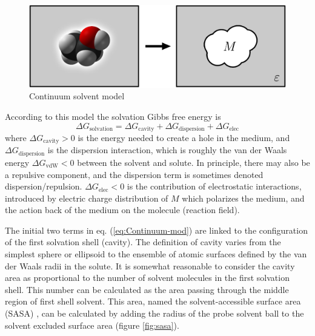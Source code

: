 \begin{figure}[h]
\begin{centering}
\includegraphics[width=0.72\columnwidth]{_figure/reaction-field-model_2}
\par\end{centering}
\caption{Continuum solvent model\label{fig:Reaction-field-model}}
\end{figure}

According to this model the solvation Gibbs free energy is
\begin{equation}
\Delta G_{\mathrm{solvation}}=\Delta G_{\mathrm{cavity}}+\Delta G_{\mathrm{dispersion}}+\Delta G_{\mathrm{elec}}\label{eq:Continuum-mod}
\end{equation}
where $\Delta G_{\mathrm{cavity}}>0$ is the energy needed to create
a hole in the medium, and $\Delta G_{\mathrm{dispersion}}$ is the
dispersion interaction, which is roughly the van der Waals energy
$\Delta G_{\mathrm{vdW}}<0$ between the solvent and solute. In principle,
there may also be a repulsive component, and the dispersion term is
sometimes denoted dispersion/repulsion. $\Delta G_{\mathrm{elec}}<0$
is the contribution of electrostatic interactions, introduced by electric
charge distribution of $M$ which polarizes the medium, and the action
back of the medium on the molecule (reaction field). 

The initial two terms in eq. (\ref{eq:Continuum-mod}) are linked
to the configuration of the first solvation shell (cavity). The definition
of cavity varies from the simplest sphere or ellipsoid to the ensemble
of atomic surfaces defined by the van der Waals radii in the solute.
It is somewhat reasonable to consider the cavity area as proportional
to the number of solvent molecules in the first solvation shell. This
number can be calculated as the area passing through the middle region
of first shell solvent. This area, named the solvent-accessible surface
area (SASA) \citep{SAS_1,SAS_2}, can be calculated by adding the
radius of the probe solvent ball to the solvent excluded surface area
(figure \ref{fig:sasa}).

